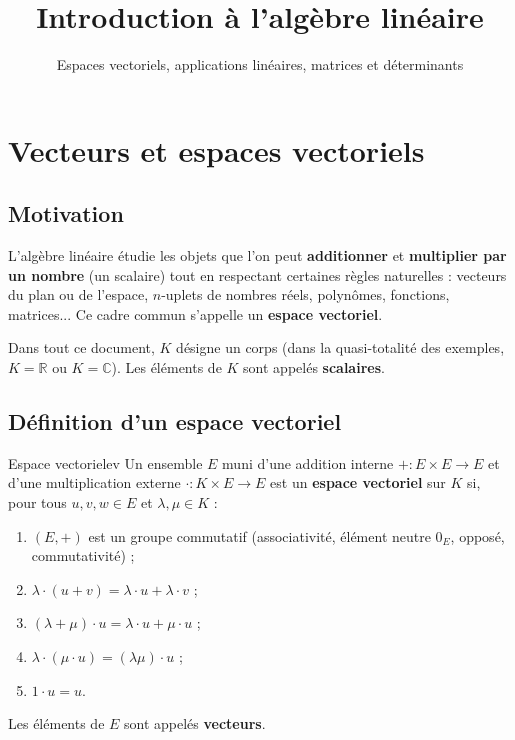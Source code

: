\documentclass[theme=pringlea]{myrtille}
\title{Introduction à l'algèbre linéaire}
\subtitle{Espaces vectoriels, applications linéaires, matrices et déterminants}
\begin{document}
\makecoversimple


\section{Vecteurs et espaces vectoriels}

\subsection{Motivation}
L'algèbre linéaire étudie les objets que l'on peut \textbf{additionner} et \textbf{multiplier par un nombre} (un scalaire) tout en respectant certaines règles naturelles : vecteurs du plan ou de l'espace, $n$-uplets de nombres réels, polynômes, fonctions, matrices... Ce cadre commun s'appelle un \textbf{espace vectoriel}.

\begin{infobox}
Dans tout ce document, $K$ désigne un corps (dans la quasi-totalité des exemples, $K = \mathbb{R}$ ou $K = \mathbb{C}$). Les éléments de $K$ sont appelés \textbf{scalaires}.
\end{infobox}

\subsection{Définition d'un espace vectoriel}
\begin{myrdef}{Espace vectoriel}{ev}
Un ensemble $E$ muni d'une addition interne $+ : E \times E \to E$ et d'une multiplication externe $\cdot : K \times E \to E$ est un \textbf{espace vectoriel} sur $K$ si, pour tous $u, v, w \in E$ et $\lambda, \mu \in K$ :
\begin{enumerate}
    \item $(E, +)$ est un groupe commutatif (associativité, élément neutre $0_E$, opposé, commutativité) ;
    \item $\lambda \cdot (u + v) = \lambda \cdot u + \lambda \cdot v$ ;
    \item $(\lambda + \mu) \cdot u = \lambda \cdot u + \mu \cdot u$ ;
    \item $\lambda \cdot (\mu \cdot u) = (\lambda \mu) \cdot u$ ;
    \item $1 \cdot u = u$.
\end{enumerate}
Les éléments de $E$ sont appelés \textbf{vecteurs}.
\end{myrdef}
\end{document}
